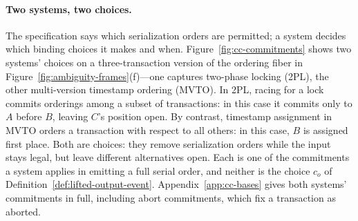 \paragraph{Two systems, two choices.}
The specification says which serialization orders are permitted; a system
decides which binding choices it makes and when.
Figure~\ref{fig:cc-commitments} shows two systems' choices on a
three-transaction version of the ordering fiber in
Figure~\ref{fig:ambiguity-frames}(f)---one captures
two-phase locking (2PL), the other multi-version timestamp ordering (MVTO).
In 2PL, racing for a lock commits orderings among a subset of transactions:
in this case it commits only to $A$ before $B$, leaving $C$'s position
open.  By contrast, timestamp assignment in MVTO orders a transaction with respect to all others:
in this case, $B$ is assigned first place.  Both are choices: they remove
serialization orders while the input stays legal, but leave different
alternatives open.  Each is one of the commitments a system applies in emitting
a full serial order, and neither is the choice $c_o$ of
Definition~\ref{def:lifted-output-event}.
Appendix~\ref{app:cc-bases} gives both systems' commitments in full, including
abort commitments, which fix a transaction as aborted.

